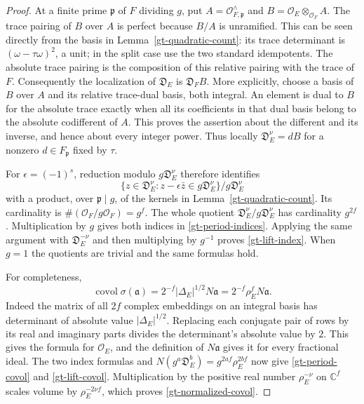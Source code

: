 \begin{proof}
At a finite prime $\mathfrak p$ of $F$ dividing $g$, put
$A=\mathcal O_{F,\mathfrak p}^{\wedge}$ and
$B=\mathcal O_E\otimes_{\mathcal O_F}A$.
The trace pairing of $B$ over $A$ is perfect because $B/A$ is
unramified.  This can be seen directly from the basis in
Lemma~\ref{gt-quadratic-count}: its trace determinant is
$(\omega-\tau\omega)^2$, a unit; in the split case use the
two standard idempotents.  The absolute trace pairing is the
composition of this relative pairing with the trace of $F$.
Consequently the localization of $\mathfrak D_E$ is
$\mathfrak D_F B$.  More explicitly, choose a basis of $B$
over $A$ and its relative trace-dual basis, both integral.
An element is dual to $B$ for the absolute trace exactly when
all its coefficients in that dual basis belong to the absolute
codifferent of $A$.  This proves the assertion about the
different and its inverse, and hence about every integer power.
Thus locally $\mathfrak D_E^\nu=dB$ for a nonzero $d\in F_{\mathfrak p}$
fixed by $\tau$.

For $\epsilon=(-1)^s$, reduction modulo $g\mathfrak D_E^\nu$
therefore identifies
\[
 \{z\in\mathfrak D_E^\nu:z-\epsilon\bar z
                            \in g\mathfrak D_E^\nu\}
       /g\mathfrak D_E^\nu
\]
with a product, over $\mathfrak p\mid g$, of the kernels in
Lemma~\ref{gt-quadratic-count}.  Its cardinality is
$\#(\mathcal O_F/g\mathcal O_F)=g^f$.
The whole quotient
$\mathfrak D_E^\nu/g\mathfrak D_E^\nu$ has cardinality
$g^{2f}$.  Multiplication by $g$ gives both indices in
\eqref{gt-period-indices}.  Applying the same argument with
$\mathfrak D_E^{-\nu}$ and then multiplying by $g^{-1}$ proves
\eqref{gt-lift-index}.  When $g=1$ the quotients are trivial
and the same formulas hold.

For completeness,
\begin{equation}\label{gt-ideal-covol}
 \operatorname{covol}\sigma(\mathfrak a)
       =2^{-f}|\Delta_E|^{1/2}N\mathfrak a
       =2^{-f}\rho_E^fN\mathfrak a.
\end{equation}
Indeed the matrix of all $2f$ complex embeddings on an integral
basis has determinant of absolute value $|\Delta_E|^{1/2}$.
Replacing each conjugate pair of rows by its real and imaginary
parts divides the determinant's absolute value by $2$.
This gives the formula for $\mathcal O_E$, and the definition of
$N\mathfrak a$ gives it for every fractional ideal.
The two index formulas and
$N(g^a\mathfrak D_E^b)=g^{2af}\rho_E^{2bf}$ now give
\eqref{gt-period-covol} and \eqref{gt-lift-covol}.
Multiplication by the positive real number $\rho_E^{-\nu}$
on $\mathbb C^f$ scales volume by $\rho_E^{-2\nu f}$,
which proves \eqref{gt-normalized-covol}.
\end{proof}

